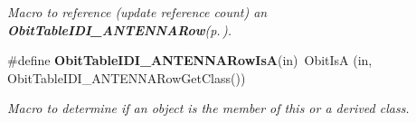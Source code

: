 \begin{CompactItemize}
\begin{CompactList}\small\item\em Macro to reference (update reference count) an {\bf Obit\-Table\-IDI\_\-ANTENNARow}{\rm (p.\,\pageref{structObitTableIDI__ANTENNARow})}. \item\end{CompactList}\item 
\#define {\bf Obit\-Table\-IDI\_\-ANTENNARow\-Is\-A}(in)\ Obit\-Is\-A (in, Obit\-Table\-IDI\_\-ANTENNARow\-Get\-Class())
\begin{CompactList}\small\item\em Macro to determine if an object is the member of this or a derived class. \item\end{CompactList}\end{CompactItemize}
